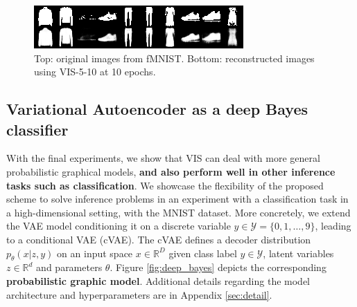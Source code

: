\begin{figure}[!ht]
  \begin{center}
\includegraphics[width=\linewidth]{img/reconstruction_mnist_gauss8_5_10_0_.png}
\end{center}
  \caption{Top: original images from fMNIST. Bottom: reconstructed images using VIS-5-10 at 10 epochs.}\label{fig:reco2}
\end{figure}

\subsection{Variational Autoencoder as a deep Bayes classifier}\label{sec:exp}
With the final experiments, we show that VIS can deal with more general probabilistic graphical models, {\bf and also perform well in other inference tasks such as classification}.
We showcase the flexibility of the proposed scheme to solve inference problems in an experiment with a classification task in a high-dimensional setting, %
with the MNIST dataset.
More concretely, we extend the VAE model conditioning it on a discrete variable $y \in \mathcal{Y} = \lbrace 0, 1, \ldots, 9 \rbrace$, leading to a conditional VAE (cVAE). The cVAE defines a decoder distribution $p_\theta(x | z, y)$ on an input space $x \in \mathbb{R}^D$ given class label $y \in \mathcal{Y}$, latent variables $z \in \mathbb{R}^d$ 
and parameters $\theta$. Figure \ref{fig:deep_bayes} depicts the corresponding {\bf probabilistic graphic model}. Additional details regarding the model architecture and hyperparameters are in Appendix
\ref{sec:detail}.

